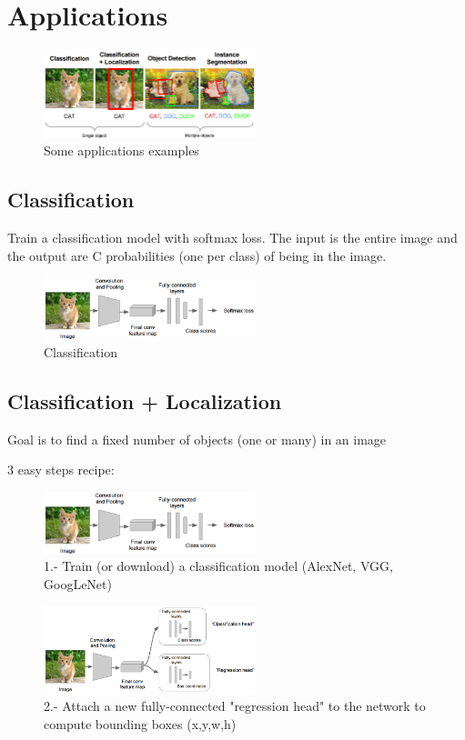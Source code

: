 \chapter{Applications}
\begin{figure}[h]
  \centering
  \includegraphics[width=0.55\textwidth]{Images/applications/1.png}
  \caption{Some applications examples}
\end{figure}

\section{Classification}
Train a classification model with softmax loss. The input is the entire image and the output are C probabilities (one per class) of being in the image.
\begin{figure}[h]
  \centering
  \includegraphics[width=0.55\textwidth]{Images/applications/2.png}
  \caption{Classification}
\end{figure}


\section{Classification + Localization}
Goal is to find a fixed number of objects (one or many) in an image

3 easy steps recipe:

\begin{figure}[h]
  \centering
  \includegraphics[width=0.55\textwidth]{Images/applications/3.png}
  \caption{1.- Train (or download) a classification model (AlexNet, VGG, GoogLeNet)}
\end{figure}
\begin{figure}[h]
  \centering
  \includegraphics[width=0.55\textwidth]{Images/applications/26.png}
  \caption{2.- Attach a new fully-connected "regression head" to the network to compute bounding boxes (x,y,w,h)}
\end{figure}

